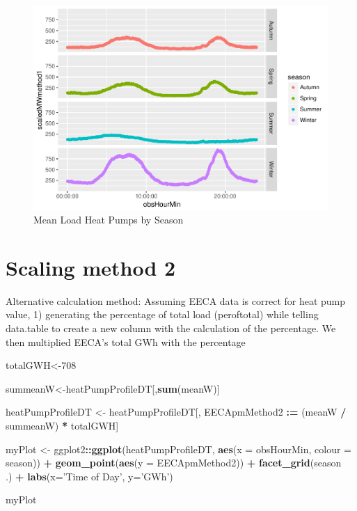 \documentclass[]{article}
\newenvironment{Shaded}{\begin{snugshade}}{\end{snugshade}}
\newcommand{\KeywordTok}[1]{\textcolor[rgb]{0.13,0.29,0.53}{\textbf{#1}}}
\newcommand{\DataTypeTok}[1]{\textcolor[rgb]{0.13,0.29,0.53}{#1}}
\newcommand{\DecValTok}[1]{\textcolor[rgb]{0.00,0.00,0.81}{#1}}
\newcommand{\StringTok}[1]{\textcolor[rgb]{0.31,0.60,0.02}{#1}}
\newcommand{\OperatorTok}[1]{\textcolor[rgb]{0.81,0.36,0.00}{\textbf{#1}}}
\newcommand{\ErrorTok}[1]{\textcolor[rgb]{0.64,0.00,0.00}{\textbf{#1}}}
\newcommand{\NormalTok}[1]{#1}
\theoremstyle{definition}
\theoremstyle{definition}
\theoremstyle{definition}
\theoremstyle{remark}
\begin{document}
\begin{figure}
\centering
\includegraphics{heatPumpProfileAnalysis_files/figure-latex/scaledUpPlots-1.pdf}
\caption{\label{fig:scaledUpPlots}Mean Load Heat Pumps by Season}
\end{figure}

\section{Scaling method 2}\label{scaling-method-2}

Alternative calculation method: Assuming EECA data is correct for heat
pump value, 1) generating the percentage of total load (peroftotal)
while telling data.table to create a new column with the calculation of
the percentage. We then multiplied EECA's total GWh with the percentage

\begin{Shaded}
\begin{Highlighting}[]
\NormalTok{totalGWH<-}\DecValTok{708}

\NormalTok{summeanW<-heatPumpProfileDT[,}\KeywordTok{sum}\NormalTok{(meanW)]}



\NormalTok{heatPumpProfileDT <-}\StringTok{ }\NormalTok{heatPumpProfileDT[, EECApmMethod2 }\OperatorTok{:}\ErrorTok{=}\StringTok{ }\NormalTok{(meanW }\OperatorTok{/}\StringTok{ }\NormalTok{summeanW) }\OperatorTok{*}\StringTok{ }\NormalTok{totalGWH] }

\NormalTok{myPlot <-}\StringTok{ }\NormalTok{ggplot2}\OperatorTok{::}\KeywordTok{ggplot}\NormalTok{(heatPumpProfileDT, }\KeywordTok{aes}\NormalTok{(}\DataTypeTok{x =}\NormalTok{ obsHourMin, }\DataTypeTok{colour =}\NormalTok{ season)) }\OperatorTok{+}
\StringTok{  }\KeywordTok{geom_point}\NormalTok{(}\KeywordTok{aes}\NormalTok{(}\DataTypeTok{y =}\NormalTok{ EECApmMethod2)) }\OperatorTok{+}
\StringTok{  }\KeywordTok{facet_grid}\NormalTok{(season }\OperatorTok{~}\StringTok{ }\NormalTok{.) }\OperatorTok{+}
\StringTok{  }\KeywordTok{labs}\NormalTok{(}\DataTypeTok{x=}\StringTok{'Time of Day'}\NormalTok{, }\DataTypeTok{y=}\StringTok{'GWh'}\NormalTok{)}

\NormalTok{myPlot}
\end{Highlighting}
\end{Shaded}
\end{document}
